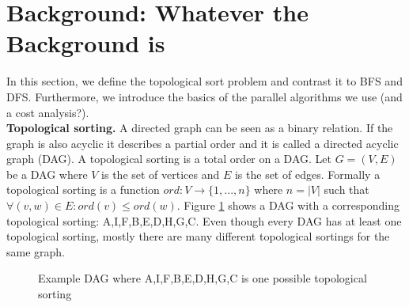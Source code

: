 \documentclass[letterpaper]{article}
\newcommand{\mypar}[1]{{\bf #1.}}
\begin{document}
\section{Background: Whatever the Background is}\label{sec:background}

 In this section, we define the topological sort problem and contrast it to BFS and DFS.
 Furthermore, we introduce the basics of the parallel algorithms we use (and a cost analysis?).
 \\
 

\mypar{Topological sorting}
A directed graph can be seen as a binary relation. If the graph is also acyclic it describes a partial order and it is called a directed acyclic graph (DAG). A topological sorting is a total order on a DAG. Let $G = (V,E)$ be a DAG where $V$ is the set of vertices and $E$ is the set of edges. Formally a topological sorting is a function $ord: V \longrightarrow \{1,...,n\}$ where $n = |V|$ such that $\forall (v,w) \in E: ord(v) \leq ord(w)$.
Figure \ref{fig:ts-example} shows a DAG with a corresponding topological sorting: A,I,F,B,E,D,H,G,C. Even though every DAG has at least one topological sorting, mostly there are many different topological sortings for the same graph.

\begin{figure}[!hbp]
 \centering

\caption{Example DAG where A,I,F,B,E,D,H,G,C is one possible topological sorting}
\label{fig:ts-example}
\end{figure}
\end{document}
